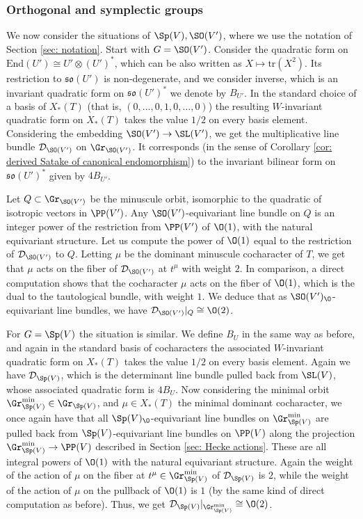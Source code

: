 \documentclass[11pt]{article}
\begin{document}
\begin{appendices}
\subsubsection{Orthogonal and symplectic groups}
We now consider the situations of $\Sp(V), \SO(V')$, where we use the notation of Section \ref{sec: notation}.
Start with $G=\SO(V')$. Consider the quadratic form on $\mathrm{End}(U')\cong U'\otimes (U')^*$, which can be also written as $X\mapsto \mathrm{tr}(X^2)$. Its restriction to $\mathfrak{so}(U')$ is non-degenerate, and we consider inverse, which is an invariant quadratic form on $\mathfrak{so}(U')^*$ we denote by $B_{U'}$.
In the standard choice of a basis of $X_*(T)$ (that is, $(0,\dots, 0, 1, 0, \dots, 0)$) the resulting $W$-invariant quadratic form on $X_*(T)$ takes the value $1/2$ on every basis element.
Considering the embedding $\SO(V')\to \SL(V')$, we get the multiplicative line bundle $\mathcal{D}_{\SO(V')}$ on $\Gr_{\SO(V')}$.
It corresponds (in the sense of Corollary \ref{cor: derived Satake of canonical endomorphism}) to the invariant bilinear form on $\mathfrak{so}(U')^*$ given by $4B_{U'}$.

Let $Q\subset \Gr_{\SO(V')}$ be the minuscule orbit, isomorphic to the quadratic of isotropic vectors in $\PP(V')$. Any $\SO(V')$-equivariant line bundle on $Q$ is an integer power of the restriction from $\PP(V')$ of $\O(1)$, with the natural equivariant structure.
Let us compute the power of $\O(1)$ equal to the restriction of $\mathcal{D}_{\SO(V')}$ to $Q$. Letting $\mu$ be the dominant minuscule cocharacter of $T$, we get that $\mu$ acts on the fiber of $\mathcal{D}_{\SO(V')}$ at $t^\mu$ with weight $2$. In comparison, a direct computation shows that the cocharacter $\mu$ acts on the fiber of $\O(1)$, which is the dual to the tautological bundle, with weight $1$. We deduce that as $\SO(V')_\O$-equivariant line bundles, we have $\mathcal{D}_{\SO(V')}|_Q\cong \O(2)$.

For $G=\Sp(V)$ the situation is similar. We define $B_U$ in the same way as before, and again in the standard basis of cocharacters the associated $W$-invariant quadratic form on $X_*(T)$ takes the value $1/2$ on every basis element. Again we have $\mathcal{D}_{\Sp(V)}$, which is the determinant line bundle pulled back from $\SL(V)$, whose associated quadratic form is $4B_U$.
Now considering the minimal orbit $\Gr_{\Sp(V)}^\mathrm{min}\in \Gr_{\Sp(V)}$, and $\mu\in X_*(T)$ the minimal dominant cocharacter, we once again have that all $\Sp(V)_\O$-equivariant line bundles on $\Gr_{\Sp(V)}^\mathrm{min}$ are pulled back from $\Sp(V)$-equivariant line bundles on $\PP(V)$ along the projection $\Gr_{\Sp(V)}^\mathrm{min}\to \PP(V)$ described in Section \ref{sec: Hecke actions}. These are all integral powers of $\O(1)$ with the natural equivariant structure. Again the weight of the action of $\mu$ on the fiber at $t^\mu\in \Gr_{\Sp(V)}^\mathrm{min}$ of $\mathcal{D}_{\Sp(V)}$ is $2$, while the weight of the action of $\mu$ on the pullback of $\O(1)$ is $1$ (by the same kind of direct computation as before). Thus, we get $\mathcal{D}_{\Sp(V)}|_{\Gr_{\Sp(V)}^\mathrm{min}} \cong \O(2)$.

\end{appendices}

\printbibliography
\end{document}
